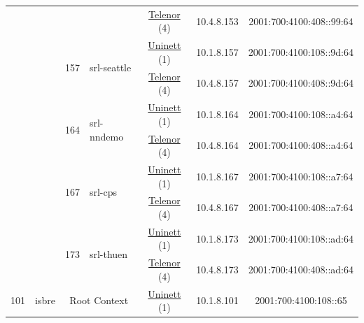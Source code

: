 \begin{small}
\begin{center}
\begin{longtable}{|c|c|c|c|c|c|c|c|}
  &  &  &  & \multicolumn{2}{|c|}{\tiny{\href{https://www.telenor.no}{Telenor} (4)}} & \tiny{10.4.8.153} & \tiny{2001:700:4100:408::99:64} \\* \cline{3-3}\cline{4-4}\cline{5-5}\cline{6-6}\cline{7-7}\cline{8-8}
  &  & \multirow{2}{*}{\tiny{157}} & \multicolumn{1}{|l|}{\multirow{2}{*}{\tiny{srl-seattle}}} & \multicolumn{2}{|c|}{\tiny{\href{https://www.uninett.no}{Uninett} (1)}} & \tiny{10.1.8.157} & \tiny{2001:700:4100:108::9d:64} \\* \cline{5-5}\cline{6-6}\cline{7-7}\cline{8-8}
  &  &  &  & \multicolumn{2}{|c|}{\tiny{\href{https://www.telenor.no}{Telenor} (4)}} & \tiny{10.4.8.157} & \tiny{2001:700:4100:408::9d:64} \\* \cline{3-3}\cline{4-4}\cline{5-5}\cline{6-6}\cline{7-7}\cline{8-8}
  &  & \multirow{2}{*}{\tiny{164}} & \multicolumn{1}{|l|}{\multirow{2}{*}{\tiny{srl-nndemo}}} & \multicolumn{2}{|c|}{\tiny{\href{https://www.uninett.no}{Uninett} (1)}} & \tiny{10.1.8.164} & \tiny{2001:700:4100:108::a4:64} \\* \cline{5-5}\cline{6-6}\cline{7-7}\cline{8-8}
  &  &  &  & \multicolumn{2}{|c|}{\tiny{\href{https://www.telenor.no}{Telenor} (4)}} & \tiny{10.4.8.164} & \tiny{2001:700:4100:408::a4:64} \\* \cline{3-3}\cline{4-4}\cline{5-5}\cline{6-6}\cline{7-7}\cline{8-8}
  &  & \multirow{2}{*}{\tiny{167}} & \multicolumn{1}{|l|}{\multirow{2}{*}{\tiny{srl-cps}}} & \multicolumn{2}{|c|}{\tiny{\href{https://www.uninett.no}{Uninett} (1)}} & \tiny{10.1.8.167} & \tiny{2001:700:4100:108::a7:64} \\* \cline{5-5}\cline{6-6}\cline{7-7}\cline{8-8}
  &  &  &  & \multicolumn{2}{|c|}{\tiny{\href{https://www.telenor.no}{Telenor} (4)}} & \tiny{10.4.8.167} & \tiny{2001:700:4100:408::a7:64} \\* \cline{3-3}\cline{4-4}\cline{5-5}\cline{6-6}\cline{7-7}\cline{8-8}
  &  & \multirow{2}{*}{\tiny{173}} & \multicolumn{1}{|l|}{\multirow{2}{*}{\tiny{srl-thuen}}} & \multicolumn{2}{|c|}{\tiny{\href{https://www.uninett.no}{Uninett} (1)}} & \tiny{10.1.8.173} & \tiny{2001:700:4100:108::ad:64} \\* \cline{5-5}\cline{6-6}\cline{7-7}\cline{8-8}
  &  &  &  & \multicolumn{2}{|c|}{\tiny{\href{https://www.telenor.no}{Telenor} (4)}} & \tiny{10.4.8.173} & \tiny{2001:700:4100:408::ad:64} \\ \hline
 \multirow{24}{*}{\tiny{101}} & \multicolumn{1}{|l|}{\multirow{24}{*}{\tiny{isbre}}} & \multicolumn{2}{|c|}{\multirow{2}{*}{\tiny{Root Context}}} & \multicolumn{2}{|c|}{\tiny{\href{https://www.uninett.no}{Uninett} (1)}} & \tiny{10.1.8.101} & \tiny{2001:700:4100:108::65} \\* \cline{5-5}\cline{6-6}\cline{7-7}\cline{8-8}

\end{longtable}
\end{center}
\end{small}

